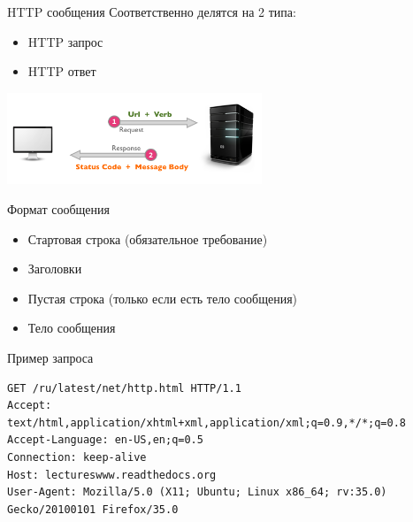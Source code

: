 \begin{frame}{HTTP сообщения}
    Соответственно делятся на 2 типа:
    \begin{itemize}
        \item HTTP запрос
        \item HTTP ответ
    \end{itemize}
    \begin{center}
        \includegraphics[width=3in]{media/client-server-details.png}
    \end{center}
\end{frame}

\begin{frame}{Формат сообщения}
    \begin{itemize}
        \item Стартовая строка (обязательное требование)
        \item Заголовки
        \item Пустая строка (только если есть тело сообщения)
        \item Тело сообщения
    \end{itemize}
\end{frame}

\begin{frame}[fragile]{Пример запроса}
    \begin{Verbatim}[fontsize=\scriptsize]
GET /ru/latest/net/http.html HTTP/1.1
Accept: text/html,application/xhtml+xml,application/xml;q=0.9,*/*;q=0.8
Accept-Language: en-US,en;q=0.5
Connection: keep-alive
Host: lectureswww.readthedocs.org
User-Agent: Mozilla/5.0 (X11; Ubuntu; Linux x86_64; rv:35.0) Gecko/20100101 Firefox/35.0
    \end{Verbatim}
\end{frame}

